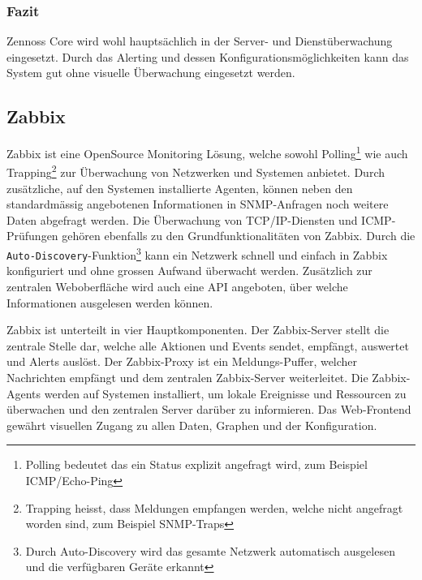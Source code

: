 \subsubsection{Fazit} \label{sec:systeme-zenoss-fazit}
  Zennoss Core wird wohl haupts\"achlich in der Server- und Dienst\"uberwachung eingesetzt. Durch das Alerting und dessen Konfigurationsm\"oglichkeiten kann das System gut ohne visuelle \"Uberwachung eingesetzt werden.


\subsection{Zabbix} \label{sec:systeme-zabbix}  
  Zabbix\cite{zabbix} ist eine OpenSource Monitoring L\"osung, welche sowohl Polling\footnote{\label{foot:polling}Polling bedeutet das ein Status explizit angefragt wird, zum Beispiel ICMP/Echo-Ping} wie auch Trapping\footnote{\label{foot:trapping}Trapping heisst, dass Meldungen empfangen werden, welche nicht angefragt worden sind, zum Beispiel SNMP-Traps} zur \"Uberwachung von Netzwerken und Systemen anbietet. Durch zus\"atzliche, auf den Systemen installierte Agenten, k\"onnen neben den standardm\"assig angebotenen Informationen in SNMP-Anfragen noch weitere Daten abgefragt werden. Die \"Uberwachung von TCP/IP-Diensten und ICMP-Pr\"ufungen geh\"oren ebenfalls zu den Grundfunktionalit\"aten von Zabbix. Durch die \texttt{Auto-Discovery}-Funktion\footnote{\label{foot:zabbix-autodisc}Durch Auto-Discovery wird das gesamte Netzwerk automatisch ausgelesen und die verf\"ugbaren Ger\"ate erkannt} kann ein Netzwerk schnell und einfach in Zabbix konfiguriert und ohne grossen Aufwand \"uberwacht werden. Zus\"atzlich zur zentralen Weboberfl\"ache wird auch eine API angeboten, \"uber welche Informationen ausgelesen werden k\"onnen.

  Zabbix ist unterteilt in vier Hauptkomponenten. Der Zabbix-Server stellt die zentrale Stelle dar, welche alle Aktionen und Events sendet, empf\"angt, auswertet und Alerts ausl\"ost. Der Zabbix-Proxy ist ein Meldungs-Puffer, welcher Nachrichten empf\"angt und dem zentralen Zabbix-Server weiterleitet. Die Zabbix-Agents werden auf Systemen installiert, um lokale Ereignisse und Ressourcen zu \"uberwachen und den zentralen Server dar\"uber zu informieren. Das Web-Frontend gew\"ahrt visuellen Zugang zu allen Daten, Graphen und der Konfiguration.

